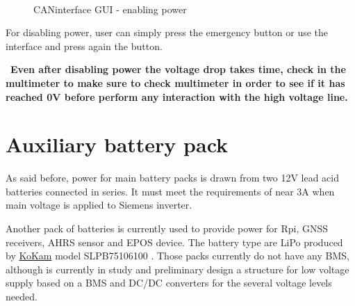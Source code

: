 \begin{figure}
	\centering
	\\
	\caption{CANinterface GUI - enabling power}
\end{figure}

For disabling power, user can simply press the emergency button or use the interface and press again the  button.
\begin{mdframed}[backgroundcolor=red!20, roundcorner=10pt, innertopmargin=5pt, innerbottommargin=5pt, skipabove=5pt]
	\Warning \, \textbf{Even after disabling power the voltage drop takes time, check in the multimeter to make sure to check multimeter in order to see if it has reached 0V before perform any interaction with the high voltage line.}
\end{mdframed}

\section{Auxiliary battery pack}
As said before, power for main battery packs is drawn from two 12V lead acid batteries connected in series. It must meet the requirements of near 3A when main voltage is applied to Siemens inverter.

Another pack of batteries is currently used to provide power for \gls{Rpi}, \gls{GNSS} receivers, \gls{AHRS} sensor and \gls{EPOS} device. The battery type are \gls{LiPo} produced by \href{kokam.com}{KoKam} model SLPB75106100 \cite{lipo_kokam}. Those packs currently do not have any \gls{BMS}, although is currently in study and preliminary design a structure for low voltage supply based on a \gls{BMS} and \gls{DC}/\gls{DC} converters for the several voltage levels needed.
 
